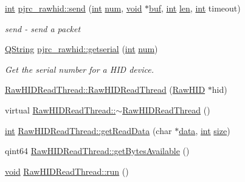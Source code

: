 \begin{DoxyCompactItemize}
\hyperlink{ioapi_8h_a787fa3cf048117ba7123753c1e74fcd6}{int} \hyperlink{group___raw_h_i_d_plugin_gac3f9d785ee170f6331278e39c6f43c00}{pjrc\-\_\-rawhid\-::send} (\hyperlink{ioapi_8h_a787fa3cf048117ba7123753c1e74fcd6}{int} \hyperlink{glext_8h_abb50fc1ead3a02a46fb52daa2045f95c}{num}, \hyperlink{group___u_a_v_objects_plugin_ga444cf2ff3f0ecbe028adce838d373f5c}{void} $\ast$\hyperlink{ioapi_8h_a8ad8a13c88886b9f623034ff88570adb}{buf}, \hyperlink{ioapi_8h_a787fa3cf048117ba7123753c1e74fcd6}{int} \hyperlink{glext_8h_ac759c9f8b2506530e65879e566e59f02}{len}, \hyperlink{ioapi_8h_a787fa3cf048117ba7123753c1e74fcd6}{int} timeout)
\begin{DoxyCompactList}\small\item\em send -\/ send a packet \end{DoxyCompactList}\item 
\hyperlink{group___u_a_v_objects_plugin_gab9d252f49c333c94a72f97ce3105a32d}{Q\-String} \hyperlink{group___raw_h_i_d_plugin_gad851d6feef1ebb7256895d5aab3ed3a4}{pjrc\-\_\-rawhid\-::getserial} (\hyperlink{ioapi_8h_a787fa3cf048117ba7123753c1e74fcd6}{int} \hyperlink{glext_8h_abb50fc1ead3a02a46fb52daa2045f95c}{num})
\begin{DoxyCompactList}\small\item\em Get the serial number for a H\-I\-D device. \end{DoxyCompactList}\item 
\hyperlink{group___raw_h_i_d_plugin_ga4a906f373d862e82a9c6972a5144a9ce}{Raw\-H\-I\-D\-Read\-Thread\-::\-Raw\-H\-I\-D\-Read\-Thread} (\hyperlink{class_raw_h_i_d}{Raw\-H\-I\-D} $\ast$hid)
\item 
virtual \hyperlink{group___raw_h_i_d_plugin_ga39a7dfe6227270e9721fb326ed792805}{Raw\-H\-I\-D\-Read\-Thread\-::$\sim$\-Raw\-H\-I\-D\-Read\-Thread} ()
\item 
\hyperlink{ioapi_8h_a787fa3cf048117ba7123753c1e74fcd6}{int} \hyperlink{group___raw_h_i_d_plugin_gaa619bfb605e0c07b6a33147d451490cb}{Raw\-H\-I\-D\-Read\-Thread\-::get\-Read\-Data} (char $\ast$\hyperlink{glext_8h_a8850df0785e6fbcc2351af3b686b8c7a}{data}, \hyperlink{ioapi_8h_a787fa3cf048117ba7123753c1e74fcd6}{int} \hyperlink{glext_8h_a014d89bd76f74ef3a29c8f04b473eb76}{size})
\item 
qint64 \hyperlink{group___raw_h_i_d_plugin_ga7a009b110ddd862add0a221ad4072e75}{Raw\-H\-I\-D\-Read\-Thread\-::get\-Bytes\-Available} ()
\item 
\hyperlink{group___u_a_v_objects_plugin_ga444cf2ff3f0ecbe028adce838d373f5c}{void} \hyperlink{group___raw_h_i_d_plugin_ga1f533b47a0fb6382c542a4fa5b344d2a}{Raw\-H\-I\-D\-Read\-Thread\-::run} ()

\end{DoxyCompactItemize}
